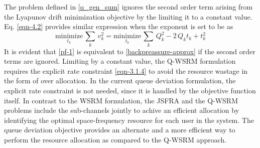 
The problem defined in \eqref{q_gen_sum} ignores the second order term arising from the Lyapunov drift minimization objective by the limiting it to a constant value. Eq. \eqref{eqn-4.2} provides similar expression when the exponent is set to be  as
\begin{equation}\label{pf-1}
\underset{t_k}{\text{minimize}} \, \sum_k \, v_k^2 = \underset{t_k}{\text{minimize}} \, \sum_k \, Q_k^2 - 2 \, Q_k t_k + t_k^2
\end{equation}
It is evident that \eqref{pf-1} is equivalent to \eqref{backpreassure-approx} if the second order terms are ignored. Limiting  by a constant value, the \ac{Q-WSRM} formulation requires the explicit rate constraint \eqref{eqn-3.1.4} to avoid the resource wastage in the form of over allocation. In the current queue deviation formulation, the explicit rate constraint is not needed, since it is handled by the objective function itself. In contrast to the \ac{WSRM} formulation, the \ac{JSFRA} and the \ac{Q-WSRM} problems include the sub-channels jointly to achive an efficient allocation by identifying the optimal space-frequency resource for each user in the system. The queue deviation objective provides an alternate and a more efficient way to perform the resource allocation as compared to the \ac{Q-WSRM} approach.
